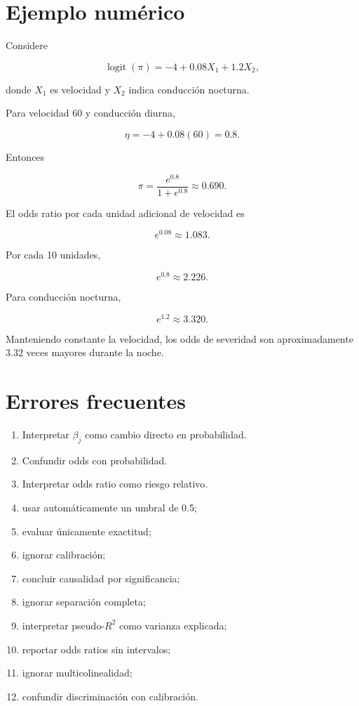 \documentclass[
  spanish,
  10.5pt,
  letterpaper,
  DIV=11,
  numbers=noendperiod,
  oneside,
  open=any]{scrreprt}
\providecommand{\tightlist}{%
  \setlength{\itemsep}{0pt}\setlength{\parskip}{0pt}}
\theoremstyle{definition}
\theoremstyle{definition}
\theoremstyle{plain}
\theoremstyle{remark}
\begin{document}
\section*{Ejemplo numérico}\label{ejemplo-numuxe9rico}


Considere

\[
\operatorname{logit}(\pi)
=
-4+0.08X_1+1.2X_2,
\]

donde \(X_1\) es velocidad y \(X_2\) indica conducción nocturna.

Para velocidad 60 y conducción diurna,

\[
\eta=-4+0.08(60)=0.8.
\]

Entonces

\[
\pi
=
\frac{e^{0.8}}{1+e^{0.8}}
\approx 0.690.
\]

El odds ratio por cada unidad adicional de velocidad es

\[
e^{0.08}\approx1.083.
\]

Por cada 10 unidades,

\[
e^{0.8}\approx2.226.
\]

Para conducción nocturna,

\[
e^{1.2}\approx3.320.
\]

Manteniendo constante la velocidad, los odds de severidad son
aproximadamente 3.32 veces mayores durante la noche.

\section*{Errores frecuentes}\label{errores-frecuentes-9}


\begin{enumerate}
\def\labelenumi{\arabic{enumi}.}
\tightlist
\item
  Interpretar \(\beta_j\) como cambio directo en probabilidad.
\item
  Confundir odds con probabilidad.
\item
  Interpretar odds ratio como riesgo relativo.
\item
  usar automáticamente un umbral de 0.5;
\item
  evaluar únicamente exactitud;
\item
  ignorar calibración;
\item
  concluir causalidad por significancia;
\item
  ignorar separación completa;
\item
  interpretar pseudo-\(R^2\) como varianza explicada;
\item
  reportar odds ratios sin intervalos;
\item
  ignorar multicolinealidad;
\item
  confundir discriminación con calibración.
\end{enumerate}
\end{document}
